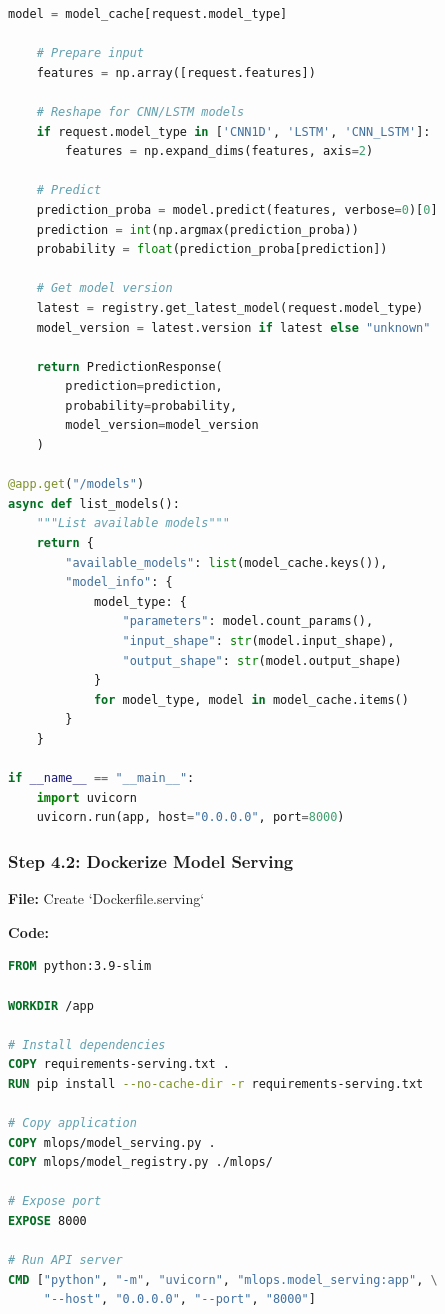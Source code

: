 \documentclass[12pt]{article}
\begin{document}
\begin{lstlisting}[language=Python]
    model = model_cache[request.model_type]
    
    # Prepare input
    features = np.array([request.features])
    
    # Reshape for CNN/LSTM models
    if request.model_type in ['CNN1D', 'LSTM', 'CNN_LSTM']:
        features = np.expand_dims(features, axis=2)
    
    # Predict
    prediction_proba = model.predict(features, verbose=0)[0]
    prediction = int(np.argmax(prediction_proba))
    probability = float(prediction_proba[prediction])
    
    # Get model version
    latest = registry.get_latest_model(request.model_type)
    model_version = latest.version if latest else "unknown"
    
    return PredictionResponse(
        prediction=prediction,
        probability=probability,
        model_version=model_version
    )

@app.get("/models")
async def list_models():
    """List available models"""
    return {
        "available_models": list(model_cache.keys()),
        "model_info": {
            model_type: {
                "parameters": model.count_params(),
                "input_shape": str(model.input_shape),
                "output_shape": str(model.output_shape)
            }
            for model_type, model in model_cache.items()
        }
    }

if __name__ == "__main__":
    import uvicorn
    uvicorn.run(app, host="0.0.0.0", port=8000)
\end{lstlisting}

\subsubsection{Step 4.2: Dockerize Model Serving}

\textbf{File:} Create `Dockerfile.serving`

\textbf{Code:}
\begin{lstlisting}[language=Dockerfile]
FROM python:3.9-slim

WORKDIR /app

# Install dependencies
COPY requirements-serving.txt .
RUN pip install --no-cache-dir -r requirements-serving.txt

# Copy application
COPY mlops/model_serving.py .
COPY mlops/model_registry.py ./mlops/

# Expose port
EXPOSE 8000

# Run API server
CMD ["python", "-m", "uvicorn", "mlops.model_serving:app", \
     "--host", "0.0.0.0", "--port", "8000"]
\end{lstlisting}
\end{document}
